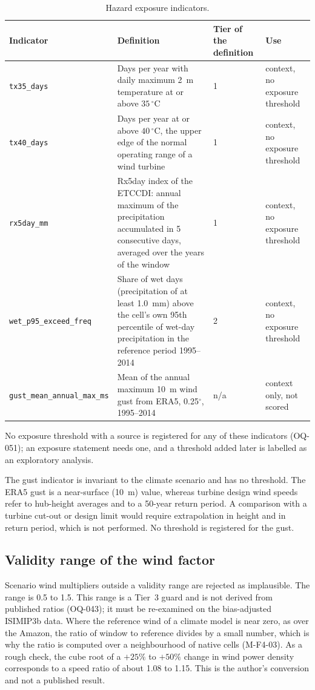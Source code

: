 \begin{table}[ht]
\centering
\caption{Hazard exposure indicators.}
\label{tab:g5-ind}
\small
\begin{tabular}{p{2.6cm}p{5.2cm}p{1.9cm}p{2.9cm}}
\toprule
Indicator & Definition & Tier of the definition & Use \\
\midrule
\texttt{tx35\_days} & Days per year with daily maximum 2~m temperature at or above $35\,^{\circ}\mathrm{C}$ & 1 & context, no exposure threshold \\
\texttt{tx40\_days} & Days per year at or above $40\,^{\circ}\mathrm{C}$, the upper edge of the normal operating range of a wind turbine & 1 & context, no exposure threshold \\
\texttt{rx5day\_mm} & Rx5day index of the ETCCDI: annual maximum of the precipitation accumulated in 5 consecutive days, averaged over the years of the window \citep{zhang2011indices} & 1 & context, no exposure threshold \\
\texttt{wet\_p95\_exceed\_freq} & Share of wet days (precipitation of at least 1.0~mm) above the cell's own 95th percentile of wet-day precipitation in the reference period 1995--2014 & 2 & context, no exposure threshold \\
\texttt{gust\_mean\_annual\_max\_ms} & Mean of the annual maximum 10~m wind gust from ERA5, 0.25$^{\circ}$, 1995--2014 & n/a & context only, not scored \\
\bottomrule
\end{tabular}
\end{table}

No exposure threshold with a source is registered for any of these indicators (OQ-051); an exposure statement needs one, and a threshold added later is labelled as an exploratory analysis.

The gust indicator is invariant to the climate scenario and has no threshold. The ERA5 gust is a near-surface (10~m) value, whereas turbine design wind speeds refer to hub-height averages and to a 50-year return period. A comparison with a turbine cut-out or design limit would require extrapolation in height and in return period, which is not performed. No threshold is registered for the gust.

\subsection{Validity range of the wind factor}
Scenario wind multipliers outside a validity range are rejected as implausible. The range is 0.5 to 1.5. This range is a Tier~3 guard and is not derived from published ratios (OQ-043); it must be re-examined on the bias-adjusted ISIMIP3b data. Where the reference wind of a climate model is near zero, as over the Amazon, the ratio of window to reference divides by a small number, which is why the ratio is computed over a neighbourhood of native cells (M-F4-03). As a rough check, the cube root of a $+25\%$ to $+50\%$ change in wind power density corresponds to a speed ratio of about 1.08 to 1.15. This is the author's conversion and not a published result. %

